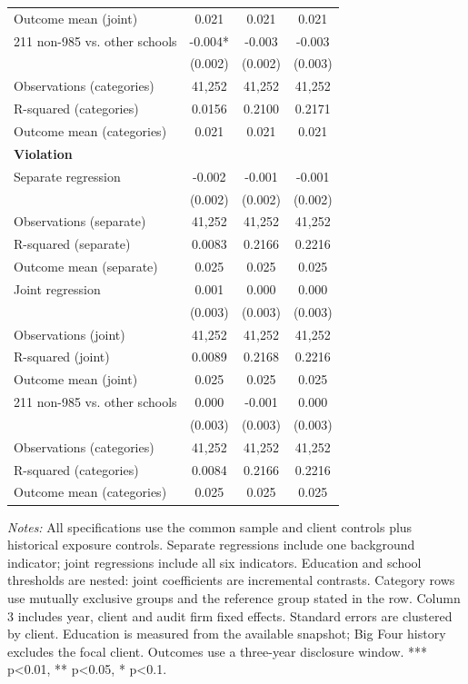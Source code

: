 \begin{table}[htbp]
\begin{threeparttable}
\begin{tabular}{p{}ccc}
Outcome mean (joint) & 0.021 & 0.021 & 0.021 \\
211 non-985 vs. other schools & -0.004* & -0.003 & -0.003 \\
 & (0.002) & (0.002) & (0.003) \\
Observations (categories) & 41,252 & 41,252 & 41,252 \\
R-squared (categories) & 0.0156 & 0.2100 & 0.2171 \\
Outcome mean (categories) & 0.021 & 0.021 & 0.021 \\
\multicolumn{4}{l}{\textbf{Violation}} \\
Separate regression & -0.002 & -0.001 & -0.001 \\
 & (0.002) & (0.002) & (0.002) \\
Observations (separate) & 41,252 & 41,252 & 41,252 \\
R-squared (separate) & 0.0083 & 0.2166 & 0.2216 \\
Outcome mean (separate) & 0.025 & 0.025 & 0.025 \\
Joint regression & 0.001 & 0.000 & 0.000 \\
 & (0.003) & (0.003) & (0.003) \\
Observations (joint) & 41,252 & 41,252 & 41,252 \\
R-squared (joint) & 0.0089 & 0.2168 & 0.2216 \\
Outcome mean (joint) & 0.025 & 0.025 & 0.025 \\
211 non-985 vs. other schools & 0.000 & -0.001 & 0.000 \\
 & (0.003) & (0.003) & (0.003) \\
Observations (categories) & 41,252 & 41,252 & 41,252 \\
R-squared (categories) & 0.0084 & 0.2166 & 0.2216 \\
Outcome mean (categories) & 0.025 & 0.025 & 0.025 \\
\bottomrule
\end{tabular}
\begin{tablenotes}\footnotesize
\item \raggedright \textit{Notes:} All specifications use the common sample and client controls plus historical exposure controls. Separate regressions include one background indicator; joint regressions include all six indicators. Education and school thresholds are nested: joint coefficients are incremental contrasts. Category rows use mutually exclusive groups and the reference group stated in the row. Column 3 includes year, client and audit firm fixed effects. Standard errors are clustered by client. Education is measured from the available snapshot; Big Four history excludes the focal client. Outcomes use a three-year disclosure window. *** p<0.01, ** p<0.05, * p<0.1.
\end{tablenotes}
\end{threeparttable}
\end{table}
